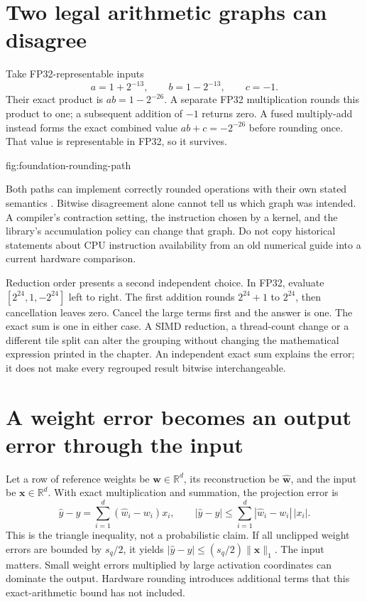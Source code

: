 \section{Two legal arithmetic graphs can disagree}
Take FP32-representable inputs
\[
 a=1+2^{-13},\qquad b=1-2^{-13},\qquad c=-1.
\]
Their exact product is $ab=1-2^{-26}$. A separate FP32
multiplication rounds this product to one; a subsequent addition
of $-1$ returns zero. A fused multiply-add instead forms the
exact combined value $ab+c=-2^{-26}$ before rounding once. That
value is representable in FP32, so it survives.

{fig:foundation-rounding-path}

Both paths can implement correctly rounded operations with their
own stated semantics \cite{nvidia2026floatingpoint}. Bitwise
disagreement alone cannot tell us which graph was intended. A
compiler's contraction setting, the instruction chosen by a kernel,
and the library's accumulation policy can change that graph. Do not
copy historical statements about CPU instruction availability from
an old numerical guide into a current hardware comparison.

Reduction order presents a second independent choice. In FP32,
evaluate $[2^{24},1,-2^{24}]$ left to right. The first addition
rounds $2^{24}+1$ to $2^{24}$, then cancellation leaves zero.
Cancel the large terms first and the answer is one. The exact
sum is one in either case. A SIMD reduction, a thread-count
change or a different tile split can alter the grouping without
changing the mathematical expression printed in the chapter.
An independent exact sum explains the error; it does not make
every regrouped result bitwise interchangeable.

\section{A weight error becomes an output error through the input}
Let a row of reference weights be $\mathbf{w}\in\mathbb{R}^d$,
its reconstruction be $\widehat{\mathbf{w}}$, and the input
be $\mathbf{x}\in\mathbb{R}^d$. With exact multiplication and
summation, the projection error is
\begin{equation}
 \widehat y-y=\sum_{i=1}^d(\widehat w_i-w_i)x_i,\qquad
 |\widehat y-y|\leq\sum_{i=1}^d|\widehat w_i-w_i|\,|x_i|.
 \label{eq:foundation-projection-error}
\end{equation}
This is the triangle inequality, not a probabilistic claim.
If all unclipped weight errors are bounded by $s_q/2$, it yields
$|\widehat y-y|\leq(s_q/2)\|\mathbf{x}\|_1$. The input matters.
Small weight errors multiplied by large activation coordinates
can dominate the output. Hardware rounding introduces additional
terms that this exact-arithmetic bound has not included.

